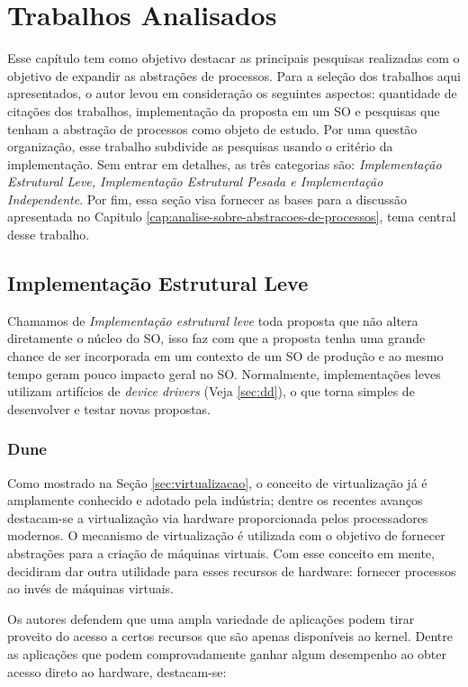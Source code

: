 \chapter{Trabalhos Analisados}
\label{cap:trabalhos-analisados}

Esse capítulo tem como objetivo destacar as principais pesquisas realizadas com
o objetivo de expandir as abstrações de processos. Para a seleção dos trabalhos
aqui apresentados, o autor levou em consideração os seguintes aspectos:
quantidade de citações dos trabalhos, implementação da proposta em um SO e
pesquisas que tenham a abstração de processos como objeto de estudo. Por uma
questão organização, esse trabalho subdivide as pesquisas usando o critério da
implementação. Sem entrar em detalhes, as três categorias são:
\textit{Implementação Estrutural Leve, Implementação Estrutural Pesada e
Implementação Independente}. Por fim, essa seção visa fornecer as bases para a
discussão apresentada no Capitulo
\ref{cap:analise-sobre-abstracoes-de-processos}, tema central desse trabalho.

\section{Implementação Estrutural Leve}

Chamamos de \textit{Implementação estrutural leve} toda proposta que não altera
diretamente o núcleo do SO, isso faz com que a proposta tenha uma grande chance
de ser incorporada em um contexto de um SO de produção e ao mesmo tempo geram
pouco impacto geral no SO. Normalmente, implementações leves utilizam
artifícios de \emph{device drivers} (Veja \ref{sec:dd}), o que torna simples de
desenvolver e testar novas propostas.

\subsection{Dune}
\label{sec:dune}

Como mostrado na Seção \ref{sec:virtualizacao}, o conceito de virtualização já
é amplamente conhecido e adotado pela indústria; dentre os recentes avanços
destacam-se a virtualização via hardware proporcionada pelos processadores
modernos. O mecanismo de virtualização é utilizada com o objetivo de fornecer
abstrações para a criação de máquinas virtuais. Com esse conceito em mente,
\cite{belay} decidiram dar outra utilidade para esses recursos de hardware:
fornecer processos ao invés de máquinas virtuais.

Os autores defendem que uma ampla variedade de aplicações podem tirar proveito
do acesso a certos recursos que são apenas disponíveis ao kernel. Dentre as
aplicações que podem comprovadamente ganhar algum desempenho ao obter acesso
direto ao hardware, destacam-se:

